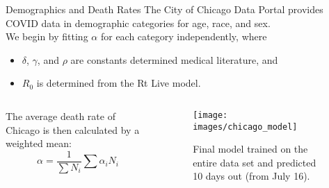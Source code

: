 \begin{slide}{Demographics and Death Rates}
The City of Chicago Data Portal provides COVID data in demographic categories for age, race, and sex. \\
We begin by fitting $\alpha$ for each category independently, where
\begin{itemize}
	\item $\delta$, $\gamma$, and $\rho$ are constants determined medical literature, and
	\item $R_0$ is determined from the Rt Live model.
\end{itemize}

\begin{columns}[T]
	\begin{column}{.4\textwidth}
		\vspace{0.5in}
		The average death rate of Chicago is then calculated by a weighted mean:
		$$\alpha = \frac{1}{\sum N_i} \sum \alpha_i N_i$$
		\vfill
	\end{column}
	\begin{column}{.5\textwidth}
		\begin{figure}[h]
			\centering
			\texttt{[image: images/chicago\_model]}
			\caption{Final model trained on the entire data set and predicted 10 days out (from July 16).}
		\end{figure}
	\end{column}
\end{columns}

\end{slide}